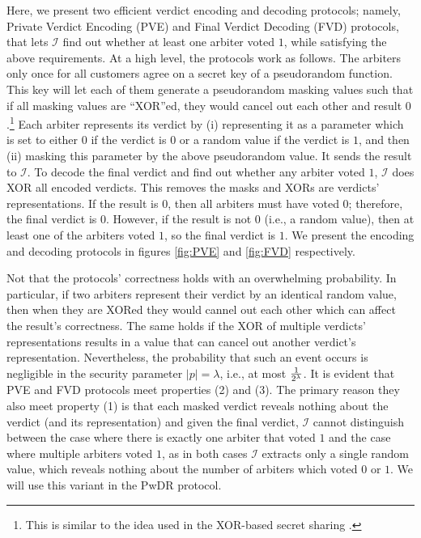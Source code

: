 Here, we present two efficient verdict encoding and decoding protocols; namely, Private Verdict Encoding (PVE) and Final Verdict Decoding (FVD) protocols, that lets $\mathcal{I}$ find out whether at least one arbiter voted $1$, while satisfying the above requirements.  At a high level, the protocols work as follows.  The arbiters only once for all customers agree on a secret key of a pseudorandom function. This key will let each of them   generate a pseudorandom masking values such that if all masking values are ``XOR''ed, they would cancel out each other and result $0$.\footnote{This is similar to the idea used in the XOR-based secret sharing \cite{Schneier0078909}.} Each arbiter represents its verdict by (i) representing it as a parameter which is set to either $0$ if the verdict is $0$ or a random value if the verdict is $1$, and then (ii) masking this parameter by the above  pseudorandom value.  It sends the result to $\mathcal{I}$.  To decode the final verdict and find out whether any arbiter voted $1$, $\mathcal{I}$  does XOR all encoded verdicts. This removes the masks and XORs are verdicts' representations.  If the result is $0$, then    all arbiters must have voted $0$; therefore,  the final verdict is $0$. However, if the result is not $0$ (i.e., a random value), then at least one of the arbiters voted $1$, so  the final verdict is $1$. We present the encoding  and decoding protocols in figures \ref{fig:PVE} and \ref{fig:FVD} respectively.
 
 
 Not that the protocols' correctness holds with an overwhelming probability. In particular, if two arbiters  represent their verdict by an identical random value, then when they are XORed they would cannel out each other which can affect the result's correctness. The same holds if the XOR of  multiple verdicts' representations results in a value that can cancel out another verdict's representation. Nevertheless, the probability that such an event occurs is negligible in the security parameter $|p|=\lambda$, i.e., at most   $\frac{1}{2^{\scriptscriptstyle \lambda}}$. It is evident that PVE and FVD protocols meet properties (2) and (3). The primary reason they also meet  property (1) is that each masked verdict reveals nothing about the verdict (and its representation) and  given the final verdict, $\mathcal{I}$ cannot distinguish between the case where there is exactly one arbiter that voted  $1$ and the case where multiple arbiters voted $1$, as in both cases $\mathcal{I}$   extracts only a single random value, which reveals nothing about the number of arbiters which voted $0$ or $1$. We will use this variant in the PwDR protocol. 
 

